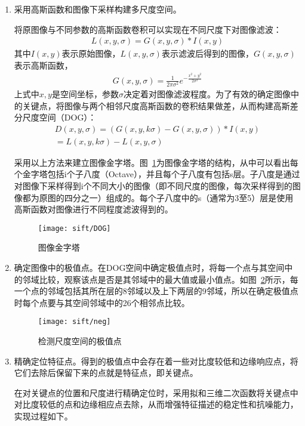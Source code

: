 \begin{enumerate}
\item 采用高斯函数和图像下采样构建多尺度空间。

  将原图像与不同参数的高斯函数卷积可以实现在不同尺度下对图像滤波：
  \begin{eqnarray}
  L(x,y,\sigma) = G(x,y,\sigma) \ast I(x,y)
  \end{eqnarray}
  其中$I(x,y)$表示原始图像，$L(x,y,\sigma)$表示滤波后得到的图像，$G(x,y,\sigma)$表示高斯函数，
  \begin{eqnarray}
  G(x,y,\sigma)=\frac{1}{2\pi \sigma^{2}}e^{-\frac{x^{2}+y^{2}}{2\sigma^{2}}}
  \end{eqnarray}
  上式中$x,y$是空间坐标，参数$\sigma$决定着对图像滤波程度。为了有效的确定图像中的关键点，将图像与两个相邻尺度高斯函数的卷积结果做差，从而构建高斯差分尺度空间（DOG）：
  \begin{multline}
  D(x,y,\sigma)=(G(x,y,k\sigma)-G(x,y,\sigma))\ast I(x,y) \\
  = L(x,y,k\sigma)-L(x,y,\sigma)
  \end{multline}

  采用以上方法来建立图像金字塔。图~\ref{fig:dog}为图像金字塔的结构，从中可以看出每个金字塔包括i个子八度（Octave），并且每个子八度有包括s层。子八度是通过对图像下采样得到i个不同大小的图像（即不同尺度的图像，每次采样得到的图像都为原图的四分之一）组成的。每个子八度中的s（通常为3至5）层是使用高斯函数对图像进行不同程度滤波得到的。
  \begin{figure}[H] %
  \centering
  \texttt{[image: sift/DOG]}
  \caption{图像金字塔}
  \label{fig:dog}
  \end{figure}

\item 确定图像中的极值点。在DOG空间中确定极值点时，将每一个点与其空间中的邻域比较，观察该点是否是其邻域中的最大值或最小值点。如图~\ref{fig:neg}所示，每一个点的邻域包括其所在层的8邻域以及上下两层的9邻域，所以在确定极值点时每个点要与其空间邻域中的26个相邻点比较。
  \begin{figure}[H] %
  \centering
  \texttt{[image: sift/neg]}
  \caption{检测尺度空间的极值点}
  \label{fig:neg}
  \end{figure}
\item 精确定位特征点。得到的极值点中会存在着一些对比度较低和边缘响应点，将它们去除后保留下来的点就是特征点，即关键点。

  在对关键点的位置和尺度进行精确定位时，采用拟和三维二次函数将关键点中对比度较低的点和边缘相应点去除，从而增强特征描述的稳定性和抗噪能力，实现过程如下。


\end{enumerate}
